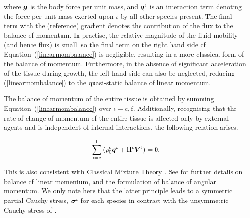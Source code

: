 \noindent where $\mbox{\boldmath$ g$}$ is the body force per unit mass, and $\mbox{\boldmath$ q$}^\iota$
is an interaction term denoting the force per unit mass exerted upon
$\iota$ by all other species present. The final term with the
(reference) gradient denotes the contribution of the flux to the
balance of momentum. In practise, the relative magnitude of the fluid
mobility (and hence flux) is small, so the final term on the right
hand side of Equation~(\ref{linearmombalance}) is negligible,
resulting in a more classical form of the balance of
momentum. Furthermore, in the absence of significant acceleration of
the tissue during growth, the left hand-side can also be neglected,
reducing (\ref{linearmombalance}) to the quasi-static balance of
linear momentum.

The balance of momentum of the entire tissue is obtained by summing
Equation~(\ref{linearmombalance}) over $\iota = \mathrm{c,f}$. Additionally,
recognising that the rate of change of momentum of the entire tissue
is affected only by external agents and is independent of internal
interactions, the following relation arises.

\begin{equation}
\sum\limits_{\iota =
  \mathrm{c}}^\mathrm{f}\left(\rho^\iota_0\mbox{\boldmath$ q$}^\iota+\Pi^\iota
\mbox{\boldmath$ V$}^\iota 
\right)= 0. \label{qrelation}
\end{equation}

\noindent This is also consistent with Classical Mixture Theory
\citep{TruesdellNoll:65}. See \citet{growthpaper} for further
details on balance of linear momentum, and the formulation of
balance of angular momentum. We only note here that the latter
principle leads to a symmetric partial Cauchy stress,
$\mbox{\boldmath$\sigma$}^\iota$ for each species in contrast with the unsymmetric
Cauchy stress of \cite{EpsteinMaugin:2000}.





